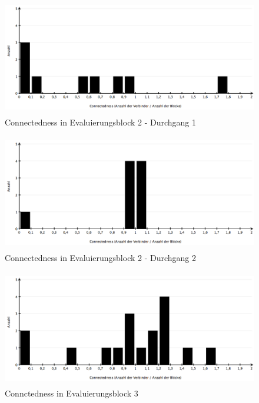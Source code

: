\begin{figure}[htbp]
	\centering
		\includegraphics[height=2in]{img/Evaluierung/connectednessAushandlung1.png}
	\caption{Connectedness in Evaluierungsblock 2 - Durchgang 1}
	\label{fig:img_Evaluierung_connectednessAushandlung1}
\end{figure}

\begin{figure}[htbp]
	\centering
		\includegraphics[height=2in]{img/Evaluierung/connectednessAushandlung2.png}
	\caption{Connectedness in Evaluierungsblock 2 - Durchgang 2}
	\label{fig:img_Evaluierung_connectednessAushandlung2}
\end{figure}

\begin{figure}[htbp]
	\centering
		\includegraphics[height=2in]{img/Evaluierung/connectednessConceptMapping.png}
	\caption{Connctedness in Evaluierungsblock 3}
	\label{fig:img_Evaluierung_connectednessConceptMapping}
\end{figure}

